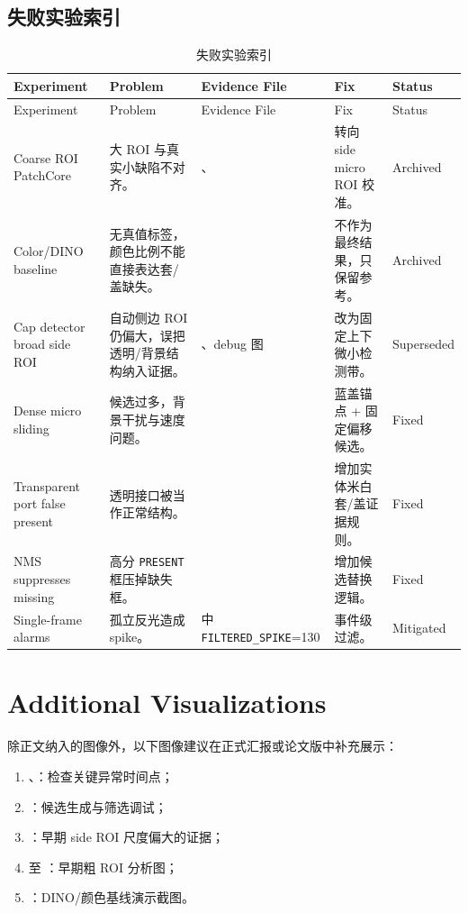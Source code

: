\documentclass[a4paper,12pt]{article}
\newcommand{\code}[1]{\texttt{#1}}
\begin{document}
\subsection{失败实验索引}
\begin{longtable}{L{0.22\textwidth}L{0.24\textwidth}L{0.24\textwidth}L{0.18\textwidth}L{0.06\textwidth}}
\caption{失败实验索引}
\label{tab:failure-index}\\
\toprule
Experiment & Problem & Evidence File & Fix & Status \\
\midrule
\endfirsthead
\toprule
Experiment & Problem & Evidence File & Fix & Status \\
\midrule
\endhead
Coarse ROI PatchCore & 大 ROI 与真实小缺陷不对齐。 & 、 & 转向 side micro ROI 校准。 & Archived \\
Color/DINO baseline & 无真值标签，颜色比例不能直接表达套/盖缺失。 &  & 不作为最终结果，只保留参考。 & Archived \\
Cap detector broad side ROI & 自动侧边 ROI 仍偏大，误把透明/背景结构纳入证据。 & 、debug 图 & 改为固定上下微小检测带。 & Superseded \\
Dense micro sliding & 候选过多，背景干扰与速度问题。 &  & 蓝盖锚点 + 固定偏移候选。 & Fixed \\
Transparent port false present & 透明接口被当作正常结构。 &  & 增加实体米白套/盖证据规则。 & Fixed \\
NMS suppresses missing & 高分 \code{PRESENT} 框压掉缺失框。 &  & 增加候选替换逻辑。 & Fixed \\
Single-frame alarms & 孤立反光造成 spike。 &  中 \code{FILTERED\_SPIKE}=130 & 事件级过滤。 & Mitigated \\
\bottomrule
\end{longtable}

\section{Additional Visualizations}
除正文纳入的图像外，以下图像建议在正式汇报或论文版中补充展示：
\begin{enumerate}[label=\arabic*.]
    \item {}、：检查关键异常时间点；
    \item {}：候选生成与筛选调试；
    \item {}：早期 side ROI 尺度偏大的证据；
    \item {} 至 ：早期粗 ROI 分析图；
    \item {}：DINO/颜色基线演示截图。
\end{enumerate}
\end{document}

